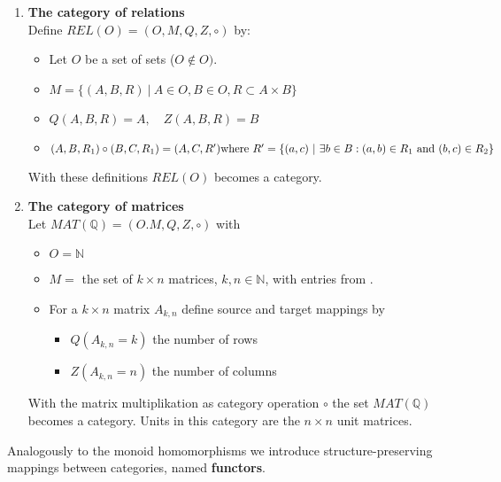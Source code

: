 \begin{enumerate}
  \item {\bf The category of relations} \\
  Define $REL(O) = (O, M, Q, Z,\circ)$ by:
  \begin{itemize}
    \item Let $O$ be a set of sets ($O \notin O)$. 
  	\item $ M = \{ (A,B,R)\ |\ A \in O, B \in O, R \subset A \times B \}$
  	\item $Q(A,B,R) = A, \quad Z(A,B,R) = B$
  	\item $(A,B,R_1) \circ (B,C,R_1) = (A,C,R')\\
  		\mbox{where}\ R'= \{ (a,c)\ |\ \exists b \in B : (a,b) \in R_1\ \mbox{and}\
  		(b,c) \in R_2 \} $
  \end{itemize}
  With these definitions $REL(O)$ becomes a category.
  
  \item {\bf The category of matrices} \\
  Let $MAT(\mathbb{Q}) = (O. M, Q, Z, \circ)$ with 
  \begin{itemize}
    \item $O = \mathbb{N}$
    \item $M = $ the set of $k \times n$ matrices, $k, n \in \mathbb{N}$, with
    entries from $\mathbb{}$.
    \item For a $k \times n$ matrix $A_{k,n}$ define source and target mappings
    by
    \begin{itemize}
	    \item[] $Q(A_{k,n} = k)$ the number of rows
  	  \item[] $Z(A_{k,n} = n)$ the number of columns
    \end{itemize}
  \end{itemize}
	With the matrix multiplikation as category operation $\circ$ the set
	$MAT(\mathbb{Q})$ becomes a category. Units in this category are the $n
  \times n$ unit matrices.
\end{enumerate}

Analogously to the monoid homomorphisms we introduce structure-preserving
mappings between categories, named {\bf functors}.

